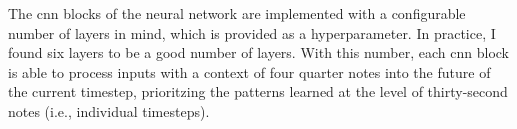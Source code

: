 
The \gls{cnn} blocks of the neural network are implemented
with a configurable number of layers in mind, which is
provided as a hyperparameter. In practice, I found six
layers to be a good number of layers. With this number, each
\gls{cnn} block is able to process inputs with a context of
four quarter notes into the future of the current timestep,
prioritzing the patterns learned at the level of
thirty-second notes (i.e., individual timesteps).

